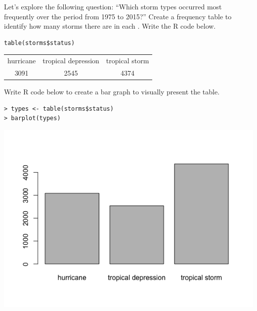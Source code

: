 \clearpage


\ii Let's explore the following question: ``Which storm types occurred most frequently over the period from 1975 to 2015?''
\bb
\ii Create a frequency table to identify how many storms there are in each \textbf{}. Write the R code below. 

\begin{multicols}{2}

\begin{lstlisting}
table(storms$status)
\end{lstlisting}

\columnbreak

\begin{tabular}{ccc}
hurricane & tropical depression   &   tropical storm \\
 3091 &  2545  &  4374
 \end{tabular}

\end{multicols}

\ii  Write R code below to create a bar graph to visually present the table. 

\begin{lstlisting}
> types <- table(storms$status)
> barplot(types)
\end{lstlisting}

\begin{multicols}{2}

\columnbreak

\includegraphics[width=0.4\tw]{02/fig-storm-types.png}

\end{multicols}


